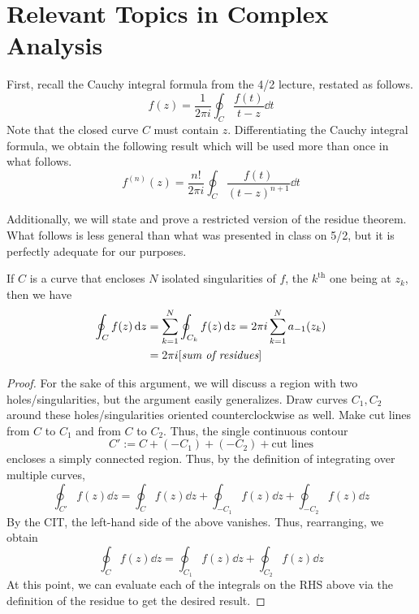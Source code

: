 \documentclass[titlepage]{article}
\numberwithin{equation}{section}
\begin{document}
\section{Relevant Topics in Complex Analysis}\label{sse:complex}
First, recall the Cauchy integral formula from the 4/2 lecture, restated as follows.
\begin{equation*}
    f(z) = \frac{1}{2\pi i}\oint_C\frac{f(t)}{t-z}\dd{t}
\end{equation*}
Note that the closed curve $C$ must contain $z$. Differentiating the Cauchy integral formula, we obtain the following result which will be used more than once in what follows.
\begin{equation*}
    f^{(n)}(z) = \frac{n!}{2\pi i}\oint_C\frac{f(t)}{(t-z)^{n+1}}\dd{t}
\end{equation*}\par
Additionally, we will state and prove a restricted version of the residue theorem. What follows is less general than what was presented in class on 5/2, but it is perfectly adequate for our purposes.
\begin{theorem}
    If $C$ is a curve that encloses $N$ isolated singularities of $f$, the $k^\text{th}$ one being at $z_k$, then we have
    \begin{align*}
        \oint_Cf(z)\dd{z} &= \sum_{k=1}^N\oint_{C_k}f(z)\dd{z}
            = 2\pi i\sum_{k=1}^Na_{-1}(z_k)\\
        &= 2\pi i[\emph{sum of residues}]
    \end{align*}
    \begin{proof}
        For the sake of this argument, we will discuss a region with two holes/singularities, but the argument easily generalizes. Draw curves $C_1,C_2$ around these holes/singularities oriented counterclockwise as well. Make cut lines from $C$ to $C_1$ and from $C$ to $C_2$. Thus, the single continuous contour
        \begin{equation*}
            C' := C+(-C_1)+(-C_2)+\text{cut lines}
        \end{equation*}
        encloses a simply connected region. Thus, by the definition of integrating over multiple curves,
        \begin{equation*}
            \oint_{C'}f(z)\dd{z} = \oint_Cf(z)\dd{z}+\oint_{-C_1}f(z)\dd{z}+\oint_{-C_2}f(z)\dd{z}
        \end{equation*}
        By the CIT, the left-hand side of the above vanishes. Thus, rearranging, we obtain
        \begin{equation*}
            \oint_Cf(z)\dd{z} = \oint_{C_1}f(z)\dd{z}+\oint_{C_2}f(z)\dd{z}
        \end{equation*}
        At this point, we can evaluate each of the integrals on the RHS above via the definition of the residue to get the desired result.
    \end{proof}
\end{theorem}
\end{document}
